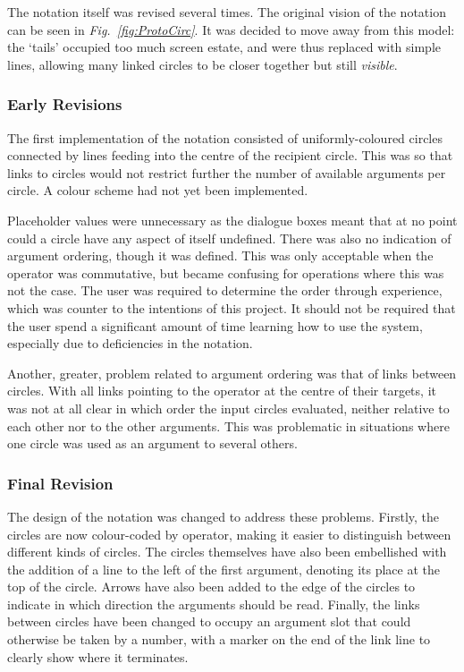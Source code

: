 \documentclass[12pt,twoside,notitlepage,xetex]{report}
\begin{document}
The notation itself was revised several times.  The original vision of the notation can be seen in \emph{Fig.~\ref{fig:ProtoCirc}}.  It was decided to move away from this model: the `tails' occupied too much screen estate, and were thus replaced with simple lines, allowing many linked circles to be closer together but still \emph{visible}.

\subsubsection{Early Revisions}

The first implementation of the notation consisted of uniformly-coloured circles connected by lines feeding into the centre of the recipient circle.  This was so that links to circles would not restrict further the number of available arguments per circle.  A colour scheme had not yet been implemented.

Placeholder values were unnecessary as the dialogue boxes meant that at no point could a circle have any aspect of itself undefined.  There was also no indication of argument ordering, though it was defined.  This was only acceptable when the operator was commutative, but became confusing for operations where this was not the case. The user was required to determine the order through experience, which was counter to the intentions of this project.  It should not be required that the user spend a significant amount of time learning how to use the system, especially due to deficiencies in the notation.

Another, greater, problem related to argument ordering was that of links between circles.  With all links pointing to the operator at the centre of their targets, it was not at all clear in which order the input circles evaluated, neither relative to each other nor to the other arguments.  This was problematic in situations where one circle was used as an argument to several others.


\subsubsection{Final Revision}
The design of the notation was changed to address these problems.  Firstly, the circles are now colour-coded by operator, making it easier to distinguish between different kinds of circles.  The circles themselves have also been embellished with the addition of a line to the left of the first argument, denoting its place at the top of the circle.  Arrows have also been added to the edge of the circles to indicate in which direction the arguments should be read.  Finally, the links between circles have been changed to occupy an argument slot that could otherwise be taken by a number, with a marker on the end of the link line to clearly show where it terminates.
\end{document}
